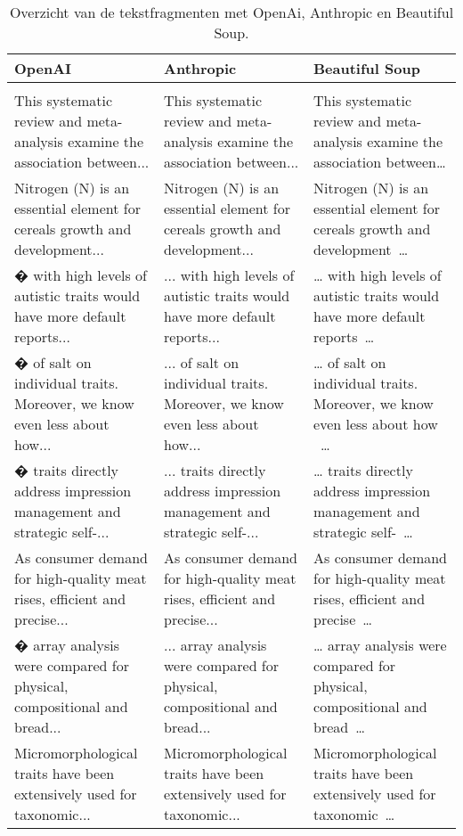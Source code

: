 \begin{table}[h!]
    \tiny
    \caption{Overzicht van de tekstfragmenten met OpenAi, Anthropic en Beautiful Soup.}
    \centering
    \begin{adjustbox}{width=1.2\textwidth,center}
    \begin{tabularx}{\textwidth}{|X|X|X|} 
        \hline
        \rowcolor{lightgray}
        OpenAI & Anthropic & Beautiful Soup \\ 
        \hline
        \rowcolor{lightgray}
        \multicolumn{3}{|X|}{Tekst}\\ 
        \hline
        This systematic review and meta-analysis examine the association between... & This systematic review and meta-analysis examine the association between... & This systematic review and meta-analysis examine the association between…\\ 
        Nitrogen (N) is an essential element for cereals growth and development... & Nitrogen (N) is an essential element for cereals growth and development... & Nitrogen (N) is an essential element for cereals growth and development …\\
        � with high levels of autistic traits would have more default reports... & ... with high levels of autistic traits would have more default reports... & … with high levels of autistic traits would have more default reports …\\
        � of salt on individual traits. Moreover, we know even less about how... & ... of salt on individual traits. Moreover, we know even less about how... & … of salt on individual traits. Moreover, we know even less about how  …\\
        � traits directly address impression management and strategic self-... & ... traits directly address impression management and strategic self-... & … traits directly address impression management and strategic self- …\\
        As consumer demand for high-quality meat rises, efficient and precise... & As consumer demand for high-quality meat rises, efficient and precise... & As consumer demand for high-quality meat rises, efficient and precise …\\
        � array analysis were compared for physical, compositional and bread... & ... array analysis were compared for physical, compositional and bread... & … array analysis were compared for physical, compositional and bread …\\
        Micromorphological traits have been extensively used for taxonomic... & Micromorphological traits have been extensively used for taxonomic... & Micromorphological traits have been extensively used for taxonomic …\\

\end{tabularx}
\end{adjustbox}
\end{table}
